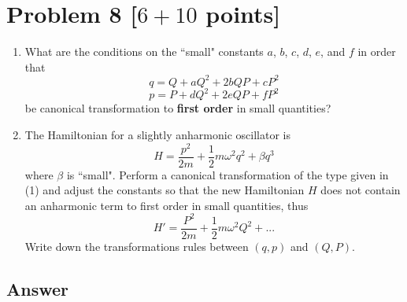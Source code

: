 \documentclass[11pt, a4paper]{article} %
\begin{document}
\section*{Problem 8 [$6 + 10$ points]}
\begin{enumerate}
\item[(1)]  What are the conditions on the ``small" constants $a$, $b$, $c$, $d$, $e$, and $f$ in order that 
\begin{equation*}
    q= Q+ aQ^2+2bQP + cP^2
\end{equation*}
\begin{equation*}
   p=P+dQ^2+2eQP+fP^2
\end{equation*}
be canonical transformation to \textbf{first order} in small quantities?

\item[(2)] The Hamiltonian for a slightly anharmonic oscillator is 
\begin{equation*}
   H=\frac{p^2}{2m} + \frac{1}{2}m\omega^2q^2 + \beta q^3
\end{equation*}
where $\beta$ is ``small". Perform a canonical transformation of the type given in (1) and adjust the constants so that the new Hamiltonian $H$ does not contain an anharmonic term to first order in small quantities, thus 
\begin{equation*}
   H'=\frac{P^2}{2m} + \frac{1}{2}m\omega^2Q^2 + ...
\end{equation*}
Write down the transformations rules between $(q, p)$ and $(Q, P)$.
\end{enumerate}

\subsection*{Answer}
\end{document}

